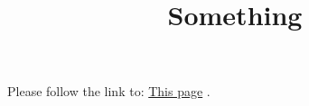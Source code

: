\documentclass[11pt,a4paper]{article}
\title{Something}
\begin{document}
\maketitle

Please follow the link to: \href{\#}{This page} .
\end{document}
